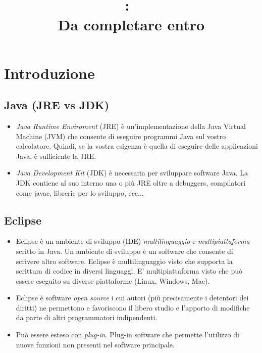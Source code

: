 \documentclass{article}
\title{
\vspace{2in}
\textmd{\textbf{\hmwkClass:\ \hmwkTitle}}\\
\normalsize\vspace{0.1in}\small{Da completare entro \hmwkDueDate}\\
\vspace{0.1in}\large{\textit{\hmwkClassInstructor}}
\vspace{3in}
}
\author{\textbf{\hmwkAuthorName}}
\date{} %
\begin{document}
\maketitle



\newpage
\tableofcontents
\newpage



\section{Introduzione}
\subsection{Java (JRE vs JDK)}
\begin{itemize}
\item \textit{Java Runtime Enviroment} (JRE) \`e un'implementazione della Java Virtual Machine (JVM) che consente di eseguire programmi Java sul vostro calcolatore. Quindi, se la vostra esigenza \`e quella di eseguire delle applicazioni Java, \`e sufficiente la JRE.  
\item  \textit{Java Development Kit} (JDK) \`e necessaria per sviluppare software Java. La JDK contiene al suo interno una o pi\`u JRE oltre a debuggers, compilatori come javac, librerie per lo sviluppo, ecc...
\end{itemize}


\subsection{Eclipse}
\begin{itemize}
\item Eclipse \`e un ambiente di sviluppo (IDE)  \textit{multilinguaggio} e \textit{multipiattaforma} scritto in Java. Un ambiente di sviluppo \` e un software che consente di scrivere altro software. Eclipse \` e multilinguaggio visto che supporta la scrittura di  codice in diversi linguaggi. E' multipiattaforma visto che pu\` o essere eseguito su diverse piattaforme (Linux, Windows, Mac).
\item Eclipse \`e  software \textit{open source} i cui autori (pi\`u precisamente i detentori dei diritti) ne permettono e favoriscono il libero studio e l'apporto di modifiche da parte di altri programmatori indipendenti.
\item Pu\`o essere esteso con \textit{plug-in}. Plug-in software che permette l'utilizzo di nuove funzioni non presenti nel software principale.
\end{itemize}
\end{document}
